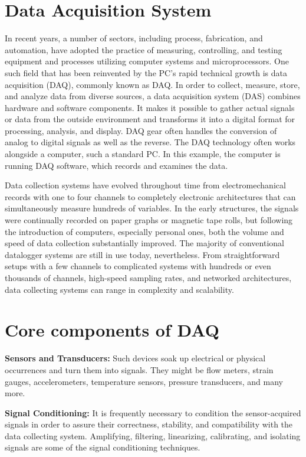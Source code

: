 \section{Data Acquisition System} 
In recent years, a number of sectors, including process, fabrication, and automation, have adopted the practice of measuring, controlling, and testing equipment and processes utilizing computer systems and microprocessors. One such field that has been reinvented by the PC's rapid technical growth is data acquisition (DAQ), commonly known as DAQ. In order to collect, measure, store, and analyze data from diverse sources, a data acquisition system (DAS) combines hardware and software components. It makes it possible to gather actual signals or data from the outside environment and transforms it into a digital format for processing, analysis, and display. DAQ gear often handles the conversion of analog to digital signals as well as the reverse. The DAQ technology often works alongside a computer, such a standard PC. In this example, the computer is running DAQ software, which records and examines the data.



\vspace{0.5cm}
Data collection systems have evolved throughout time from electromechanical records with one to four channels to completely electronic architectures that can simultaneously measure hundreds of variables. In the early structures, the signals were continually recorded on paper graphs or magnetic tape rolls, but following the introduction of computers, especially personal ones, both the volume and speed of data collection substantially improved. The majority of conventional datalogger systems are still in use today, nevertheless. From straightforward setups with a few channels to complicated systems with hundreds or even thousands of channels, high-speed sampling rates, and networked architectures, data collecting systems can range in complexity and scalability.


\section{Core components of DAQ }
\textbf{Sensors and Transducers:}
Such devices soak up electrical or physical occurrences and turn them into signals. They might be flow meters, strain gauges, accelerometers, temperature sensors, pressure transducers, and many more.
\vspace{0.5cm}\par
\textbf{Signal Conditioning:}
It is frequently necessary to condition the sensor-acquired signals in order to assure their correctness, stability, and compatibility with the data collecting system. Amplifying, filtering, linearizing, calibrating, and isolating signals are some of the signal conditioning techniques.

